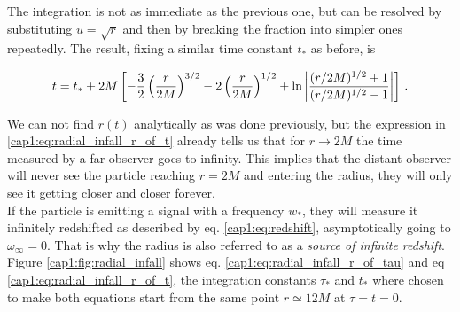 The integration is not as immediate as the previous one, but can be resolved
by substituting $u = \sqrt{r}$ and then by breaking the fraction into simpler
ones repeatedly.
The result, fixing a similar time constant $t_*$ as before, is

\begin{equation}
    t = t_* + 2M \left[ -\frac{3}{2} \left(\frac{r}{2M}\right)^{3/2}
    - 2 \left(\frac{r}{2M}\right)^{1/2}
    + \ln \abs{\frac{(r/2M)^{1/2} + 1}{(r/2M)^{1/2} - 1}} \right] \, .
    \label{cap1:eq:radial_infall_r_of_t}
\end{equation}

We can not find $r(t)$ analytically as was done previously, but the expression
in \ref{cap1:eq:radial_infall_r_of_t} already tells us that for
$r \rightarrow 2M$ the time measured by a far observer goes to infinity.
This implies that the distant observer will never see the particle reaching
$r = 2M$ and entering the \Sh radius, they will only see it getting closer and
closer forever. \\
If the particle is emitting a signal with a frequency $w_*$, they will measure
it infinitely redshifted as described by eq. \ref{cap1:eq:redshift},
asymptotically going to $\omega_\infty = 0$.
That is why the \Sh radius is also referred to as a
\textit{source of infinite redshift}. \\
Figure \ref{cap1:fig:radial_infall} shows eq.
\ref{cap1:eq:radial_infall_r_of_tau} and eq
\ref{cap1:eq:radial_infall_r_of_t}, the integration constants $\tau_*$ and
$t_*$ where chosen to make both equations start from the same point
$r \simeq 12M$ at $\tau = t =  0$.


